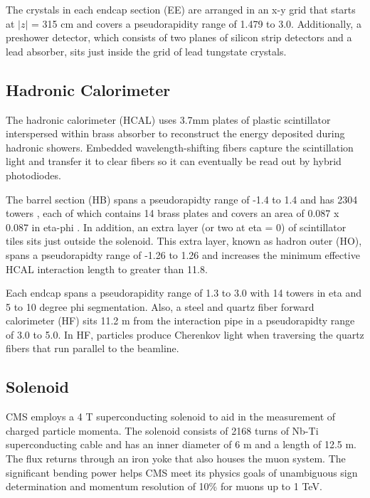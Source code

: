 \documentclass[12pt]{article}
\begin{document}
    The crystals in each endcap section (EE) are arranged in an x-y grid that starts at $|z|$ = 315 cm and covers a pseudorapidity range of 1.479 to 3.0. Additionally, a preshower detector, which consists of two planes of silicon strip detectors and a lead absorber, sits just inside the grid of lead tungstate crystals. 

\subsection{Hadronic Calorimeter}
    The hadronic calorimeter (HCAL) uses 3.7mm plates of plastic scintillator interspersed within brass absorber to reconstruct the energy deposited during hadronic showers. Embedded wavelength-shifting fibers capture the scintillation light and transfer it to clear fibers so it can eventually be read out by hybrid photodiodes.

    The barrel section (HB) spans a pseudorapidty range of -1.4 to 1.4 and has 2304 towers , each of which contains 14  brass plates and covers an area of 0.087 x 0.087 in eta-phi . In addition, an extra layer (or two at eta = 0) of scintillator tiles sits just outside the solenoid. This extra layer, known as hadron outer (HO), spans a pseudorapidty range of -1.26 to 1.26 and increases the minimum effective HCAL interaction length to greater than 11.8.

    Each endcap spans a pseudorapidity range of 1.3 to 3.0 with 14 towers in eta and 5 to 10 degree phi segmentation. Also, a steel and quartz fiber forward calorimeter (HF) sits 11.2 m from the interaction pipe in a pseudorapidty range of 3.0 to 5.0. In HF, particles produce Cherenkov light when traversing the quartz fibers that run parallel to the beamline. 

\subsection{Solenoid}
    CMS employs a 4 T superconducting solenoid to aid in the measurement of charged particle momenta. The solenoid consists of 2168 turns of Nb-Ti superconducting cable and has an inner diameter of 6 m and a length of 12.5 m. The flux returns through an iron yoke that also houses the muon system. The significant  bending power helps CMS meet its physics goals of unambiguous sign determination and momentum resolution of 10\% for muons up to 1 TeV.
\end{document}
